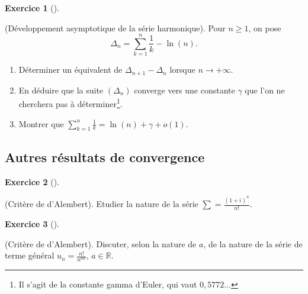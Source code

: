 \documentclass[
  french,
  letterpaper,
  DIV=11,
  numbers=noendperiod]{scrreprt}
\theoremstyle{plain}
\theoremstyle{definition}
\theoremstyle{plain}
\theoremstyle{plain}
\theoremstyle{definition}
\newtheorem{exercise}{Exercice}[chapter]
\theoremstyle{definition}
\theoremstyle{plain}
\theoremstyle{remark}
\begin{document}
\begin{exercise}[]\protect\hypertarget{exr-02-dev-serie-harmo}{}\label{exr-02-dev-serie-harmo}

(Développement asymptotique de la série harmonique). Pour
\(n\geqslant 1\), on pose
\[\Delta_n = \sum_{k=1}^n \frac{1}{k} - \ln(n).\]

\begin{enumerate}
\def\labelenumi{\arabic{enumi}.}
\item
  Déterminer un équivalent de \(\Delta_{n+1} - \Delta_n\) lorsque
  \(n\to +\infty\).
\item
  En déduire que la suite \((\Delta_n)\) converge vers une constante
  \(\gamma\) que l'on ne cherchera pas à déterminer\footnote{Il s'agit
    de la constante gamma d'Euler, qui vaut \(0,5772...\)}.
\item
  Montrer que \(\sum_{k=1}^n\frac{1}{k} = \ln(n) + \gamma + o(1)\).
\end{enumerate}

\end{exercise}

\subsection{Autres résultats de
convergence}\label{autres-ruxe9sultats-de-convergence}

\begin{exercise}[]\protect\hypertarget{exr-02-alembert-1}{}\label{exr-02-alembert-1}

(Critère de d'Alembert). Etudier la nature de la série
\(\displaystyle\sum = \frac{(1+i)^n}{n!}\).

\end{exercise}

\begin{exercise}[]\protect\hypertarget{exr-02-alembert}{}\label{exr-02-alembert}

(Critère de d'Alembert). Discuter, selon la nature de \(a\), de la
nature de la série de terme général \(u_n= \frac{n!}{n^{an}}\),
\(a\in\mathbb{R}\).

\end{exercise}
\end{document}
